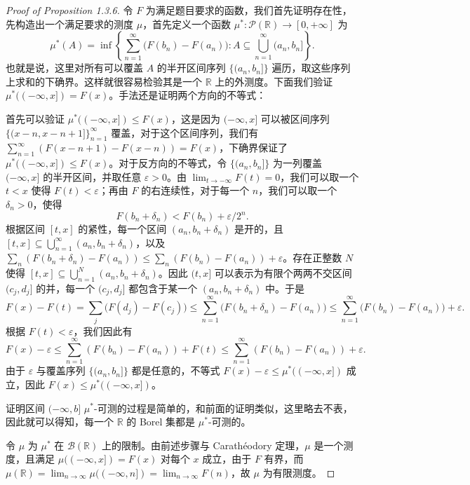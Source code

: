 \documentclass[11pt]{article}
\newcommand{\RR}{\mathbb{R}}
\newcommand{\calB}{\mathcal{B}}
\newcommand{\calP}{\mathcal{P}}
\begin{document}
\begin{proof}[Proof of Proposition 1.3.6]
    令 $F$ 为满足题目要求的函数，我们首先证明存在性，先构造出一个满足要求的测度 $\mu$，首先定义一个函数 $\mu^*:\calP(\RR)\to[0,+\infty]$ 为
    \[
        \mu^*(A) = \inf \left\{ \sum_{n=1}^{\infty}\bigl(F(b_n)-F(a_n)\bigr) : A \subseteq \bigcup_{n=1}^{\infty}(a_n,b_n] \right\}.
    \]
    也就是说，这里对所有可以覆盖 $A$ 的半开区间序列 $\{(a_n,b_n]\}$ 遍历，取这些序列上求和的下确界。这样就很容易检验其是一个 $\RR$ 上的外测度。下面我们验证 $\mu^*((-\infty,x]) = F(x)$。手法还是证明两个方向的不等式：

    首先可以验证 $\mu^*((-\infty,x]) \le F(x)$，这是因为 $(-\infty,x]$ 可以被区间序列 $\{(x-n,x-n+1]\}_{n=1}^{\infty}$ 覆盖，对于这个区间序列，我们有 $\sum_{n=1}^{\infty}(F(x-n+1)-F(x-n)) = F(x)$，下确界保证了 $\mu^*((-\infty,x]) \le F(x)$。对于反方向的不等式，令 $\{(a_n,b_n]\}$ 为一列覆盖 $(-\infty,x]$ 的半开区间，并取任意 $\varepsilon > 0$。由 $\lim_{t\to-\infty}F(t)=0$，我们可以取一个 $t < x$ 使得 $F(t) < \varepsilon$；再由 $F$ 的右连续性，对于每一个 $n$，我们可以取一个 $\delta_n > 0$，使得
    \[
        F(b_n+\delta_n) < F(b_n) + \varepsilon / 2^n.
    \]
    根据区间 $[t,x]$ 的紧性，每一个区间 $(a_n,b_n+\delta_n)$ 是开的，且 $[t,x] \subseteq \bigcup_{n=1}^{\infty}(a_n,b_n+\delta_n)$，以及 $\sum_n (F(b_n+\delta_n)-F(a_n)) \le \sum_n (F(b_n)-F(a_n)) + \varepsilon$。存在正整数 $N$ 使得 $[t,x] \subseteq \bigcup_{n=1}^N (a_n,b_n+\delta_n)$。因此 $(t,x]$ 可以表示为有限个两两不交区间 $(c_j,d_j]$ 的并，每一个 $(c_j,d_j]$ 都包含于某一个 $(a_n,b_n+\delta_n)$ 中。于是
    \[
        F(x)-F(t)
        = \sum_j \bigl(F(d_j)-F(c_j)\bigr)
        \le \sum_{n=1}^{\infty}\bigl(F(b_n+\delta_n)-F(a_n)\bigr)
        \le \sum_{n=1}^{\infty}\bigl(F(b_n)-F(a_n)\bigr) + \varepsilon.
    \]
    根据 $F(t) < \varepsilon$，我们因此有
    \[
        F(x)-\varepsilon \le \sum_{n=1}^{\infty}(F(b_n)-F(a_n)) + F(t) \le \sum_{n=1}^{\infty}(F(b_n)-F(a_n)) + \varepsilon.
    \]
    由于 $\varepsilon$ 与覆盖序列 $\{(a_n,b_n]\}$ 都是任意的，不等式 $F(x)-\varepsilon \le \mu^*((-\infty,x])$ 成立，因此 $F(x) \le \mu^*((-\infty,x])$。

    证明区间 $(-\infty,b]$ $\mu^*$-可测的过程是简单的，和前面的证明类似，这里略去不表，因此就可以得知，每一个 $\RR$ 的 Borel 集都是 $\mu^*$-可测的。

    令 $\mu$ 为 $\mu^*$ 在 $\calB(\RR)$ 上的限制。由前述步骤与 Carath\'eodory 定理，$\mu$ 是一个测度，且满足 $\mu((-\infty,x]) = F(x)$ 对每个 $x$ 成立，由于 $F$ 有界，而 $\mu(\RR) = \lim_{n\to\infty}\mu((-\infty,n]) = \lim_{n\to\infty}F(n)$，故 $\mu$ 为有限测度。


\end{proof}
\end{document}
